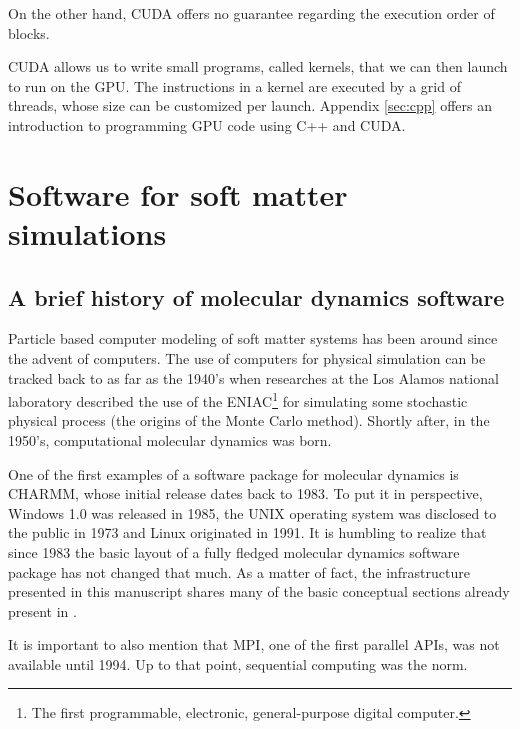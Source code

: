 \documentclass[ twoside,openright,titlepage,numbers=noenddot,%
headinclude,footinclude,cleardoublepage=empty,abstract=on,
BCOR=5mm,paper=b5,fontsize=11pt, dvipsnames
]{scrreprt}
\newcommand{\gpu}{\gls{GPU}\xspace}
\begin{document}
On the other hand, CUDA offers no guarantee regarding the execution order of blocks.

CUDA allows us to write small programs, called kernels, that we can then launch to run on the \gpu. The instructions in a kernel are executed by a grid of threads, whose size can be customized per launch. Appendix \ref{sec:cpp} offers an introduction to programming \gpu code using C++ and CUDA.


\section{Software for soft matter simulations}

\subsection*{A brief history of molecular dynamics software}
Particle based computer modeling of soft matter systems has been around since the advent of computers. The use of computers for physical simulation can be tracked back to as far as the 1940's when researches at the Los Alamos national laboratory described the use of the ENIAC\footnote{The first programmable, electronic, general-purpose digital computer.} for simulating some stochastic physical process\cite{Hurd1985} (the origins of the Monte Carlo method\cite{Johansen2010}). Shortly after, in the 1950's, computational molecular dynamics was born\cite{DeTullio2016}.

One of the first examples of a software package for molecular dynamics is CHARMM, whose initial release dates back to 1983\cite{Brooks1983}. To put it in perspective, Windows 1.0 was released in 1985, the UNIX operating system was disclosed to the public in 1973 and Linux originated in 1991. It is humbling to realize that since 1983 the basic layout of a fully fledged molecular dynamics software package has not changed that much. As a matter of fact, the infrastructure presented in this manuscript shares many of the basic conceptual sections already present in \cite{Brooks1983}.

It is important to also mention that MPI, one of the first parallel \glspl{API}, was not available until 1994. Up to that point, sequential computing was the norm.
\end{document}
